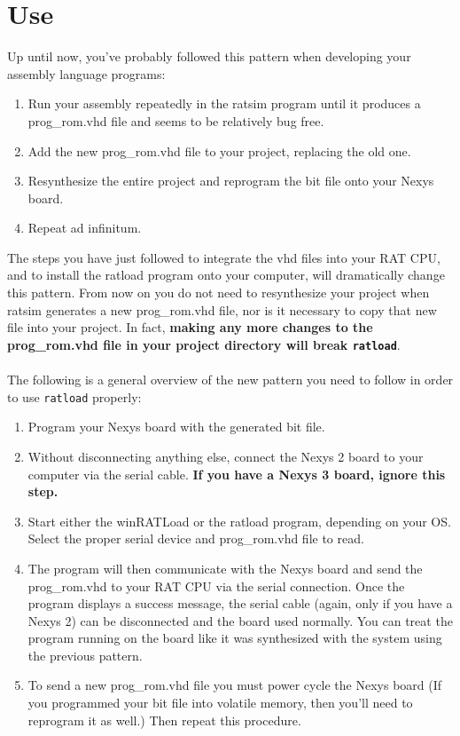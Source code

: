 \documentclass[notitlepage]{article}
\begin{document}
\section{Use}
Up until now, you've probably followed this pattern when developing your assembly language programs:
\begin{enumerate}
\item Run your assembly repeatedly in the ratsim program until it produces a prog\_rom.vhd file and seems to be relatively bug free.
\item Add the new prog\_rom.vhd file to your project, replacing the old one.
\item Resynthesize the entire project and reprogram the bit file onto your Nexys board.
\item Repeat ad infinitum.
\end{enumerate}
The steps you have just followed to integrate the vhd files into your RAT CPU, and to install the ratload program onto your computer, will dramatically change this pattern. From now on you do not need to resynthesize your project when ratsim generates a new prog\_rom.vhd file, nor is it necessary to copy that new file into your project. In fact, \textbf{making any more changes to the prog\_rom.vhd file in your project directory will break \texttt{ratload}}.\\\\
The following is a general overview of the new pattern you need to follow in order to use \texttt{ratload} properly:

\begin{enumerate}
\item Program your Nexys board with the generated bit file.

\item Without disconnecting anything else, connect the Nexys 2 board to your computer via the serial cable. \textbf{If you have a Nexys 3 board, ignore this step.}

\item Start either the winRATLoad or the ratload program, depending on your OS. Select the proper serial device and prog\_rom.vhd file to read.

\item The program will then communicate with the Nexys board and send the prog\_rom.vhd to your RAT CPU via the serial connection. Once the program displays a success message, the serial cable (again, only if you have a Nexys 2) can be disconnected and the board used normally. You can treat the program running on the board like it was synthesized with the system using the previous pattern.

\item To send a new prog\_rom.vhd file you must power cycle the Nexys board (If you programmed your bit file into volatile memory, then you'll need to reprogram it as well.) Then repeat this procedure.
\end{enumerate}
\end{document}

